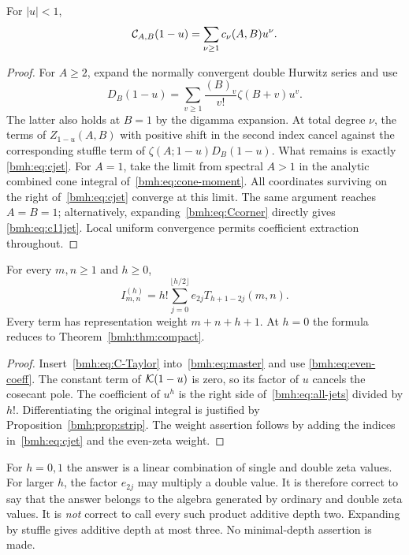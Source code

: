 \begin{lemma}\label{bmh:lem:cjet}
For $|u|<1$,
\begin{equation}\label{bmh:eq:C-Taylor}
 \mathcal C_{A,B}(1-u)=\sum_{\nu\ge1}c_\nu(A,B)u^\nu.
\end{equation}
\end{lemma}
\begin{proof}
For $A\ge2$, expand the normally convergent double Hurwitz series and
use
\[
 D_B(1-u)=\sum_{v\ge1}\frac{(B)_v}{v!}\zeta(B+v)u^v.
\]
The latter also holds at $B=1$ by the digamma expansion. At total degree
$\nu$, the terms of $Z_{1-u}(A,B)$ with positive shift in the second
index cancel against the corresponding stuffle term of
$\zeta(A;1-u)D_B(1-u)$. What remains is exactly
\eqref{bmh:eq:cjet}. For $A=1$, take the limit from spectral $A>1$ in
the analytic combined cone integral of~\eqref{bmh:eq:cone-moment}.
All coordinates surviving on the right of~\eqref{bmh:eq:cjet} converge
at this limit. The same argument reaches $A=B=1$; alternatively,
expanding~\eqref{bmh:eq:Ccorner} directly gives
\eqref{bmh:eq:c11jet}. Local uniform convergence permits coefficient
extraction throughout.
\end{proof}

\begin{theorem}
\label{bmh:thm:jets}
For every $m,n\ge1$ and $h\ge0$,
\begin{equation}\label{bmh:eq:all-jets}
 \boxed{\displaystyle
 I_{m,n}^{(h)}=h!\sum_{j=0}^{\lfloor h/2\rfloor}
                      e_{2j}T_{h+1-2j}(m,n).}
\end{equation}
Every term has representation weight $m+n+h+1$. At $h=0$ the formula
reduces to Theorem~\ref{bmh:thm:compact}.
\end{theorem}
\begin{proof}
Insert~\eqref{bmh:eq:C-Taylor} into~\eqref{bmh:eq:master} and use
\eqref{bmh:eq:even-coeff}. The constant term of $\mathcal K(1-u)$ is zero, so
its factor of $u$ cancels the cosecant pole. The coefficient of $u^h$
is the right side of~\eqref{bmh:eq:all-jets} divided by $h!$.
Differentiating the original integral is justified by
Proposition~\ref{bmh:prop:strip}. The weight assertion follows by
adding the indices in~\eqref{bmh:eq:cjet} and the even-zeta weight.
\end{proof}

\begin{remark}
For $h=0,1$ the answer is a linear combination of single and double zeta
values. For larger $h$, the factor $e_{2j}$ may multiply a double value.
It is therefore correct to say that the answer belongs to the algebra
generated by ordinary and double zeta values. It is \emph{not} correct
to call every such product additive depth two. Expanding by stuffle gives
additive depth at most three. No minimal-depth assertion is made.
\end{remark}

